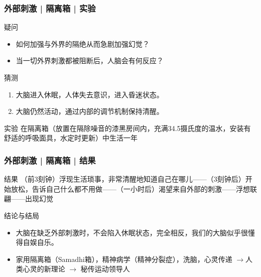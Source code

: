 \begin{frame}
  \frametitle{外部刺激 | 隔离箱 | 实验}
  \begin{block}{疑问}
    \begin{itemize}
      \item 如何加强与外界的隔绝从而急剧加强幻觉？
      \item 当一切外界刺激都被阻断后，人脑会有何反应？
    \end{itemize}
  \end{block}
  \pause
  \begin{block}{猜测}
    \begin{enumerate}
      \item 大脑进入休眠，人体失去意识，进入昏迷状态。
      \item 大脑仍然活动，通过内部的调节机制保持清醒。
    \end{enumerate}
  \end{block}
  \pause
  \begin{block}{实验}
      在隔离箱（放置在隔除噪音的漆黑房间内，充满34.5摄氏度的温水，安装有舒适的呼吸面具，水定时更新）中生活一年
  \end{block}
\end{frame}

\begin{frame}
  \frametitle{外部刺激 | 隔离箱 | 结果}
  \begin{block}{结果}
（前3刻钟）浮现生活琐事，非常清醒地知道自己在哪儿——（3刻钟后）开始放松，告诉自己什么都不用做——（一小时后）渴望来自外部的刺激——浮想联翩——出现幻觉
  \end{block}
  \pause
  \begin{block}{结论与结局}
    \begin{itemize}
      \item 大脑在缺乏外部刺激时，不会陷入休眠状态，完全相反，我们的大脑似乎很懂得自娱自乐。
      \item 家用隔离箱（Samadhi箱），精神病学（精神分裂症），洗脑，心灵传递 $\rightarrow$人类心灵的新理论 $\rightarrow$ 秘传运动领导人
    \end{itemize}
  \end{block}
\end{frame}

